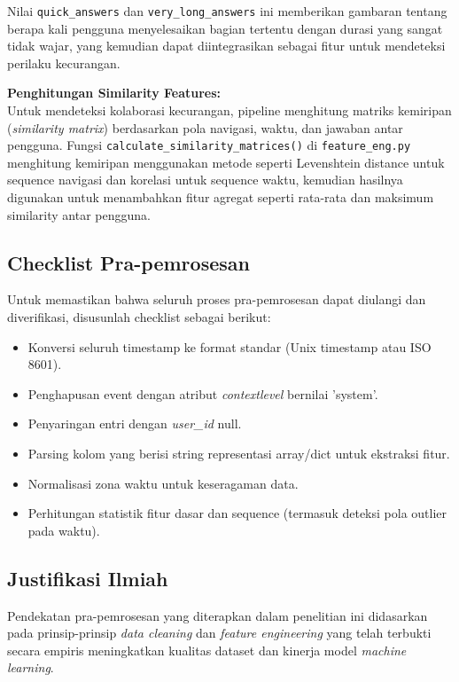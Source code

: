 Nilai \texttt{quick\_answers} dan \texttt{very\_long\_answers} ini memberikan gambaran tentang berapa kali pengguna menyelesaikan bagian tertentu dengan durasi yang sangat tidak wajar, yang kemudian dapat diintegrasikan sebagai fitur untuk mendeteksi perilaku kecurangan.

\textbf{Penghitungan Similarity Features:} \\
Untuk mendeteksi kolaborasi kecurangan, pipeline menghitung matriks kemiripan (\textit{similarity matrix}) berdasarkan pola navigasi, waktu, dan jawaban antar pengguna. Fungsi \texttt{calculate\_similarity\_matrices()} di \texttt{feature\_eng.py} menghitung kemiripan menggunakan metode seperti Levenshtein distance untuk sequence navigasi dan korelasi untuk sequence waktu, kemudian hasilnya digunakan untuk menambahkan fitur agregat seperti rata-rata dan maksimum similarity antar pengguna.




\subsection{Checklist Pra-pemrosesan}
\label{sec:checklistPraPemrosesan}
Untuk memastikan bahwa seluruh proses pra-pemrosesan dapat diulangi dan diverifikasi, disusunlah checklist sebagai berikut:
\begin{itemize}
    \item Konversi seluruh timestamp ke format standar (Unix timestamp atau ISO 8601).
    \item Penghapusan event dengan atribut \textit{contextlevel} bernilai 'system'.
    \item Penyaringan entri dengan \textit{user\_id} null.
    \item Parsing kolom yang berisi string representasi array/dict untuk ekstraksi fitur.
    \item Normalisasi zona waktu untuk keseragaman data.
    \item Perhitungan statistik fitur dasar dan sequence (termasuk deteksi pola outlier pada waktu).
\end{itemize}

\subsection{Justifikasi Ilmiah}
\label{sec:justifikasiIlmiah}
Pendekatan pra-pemrosesan yang diterapkan dalam penelitian ini didasarkan pada prinsip-prinsip \textit{data cleaning} dan \textit{feature engineering} yang telah terbukti secara empiris meningkatkan kualitas dataset dan kinerja model \textit{machine learning}.

